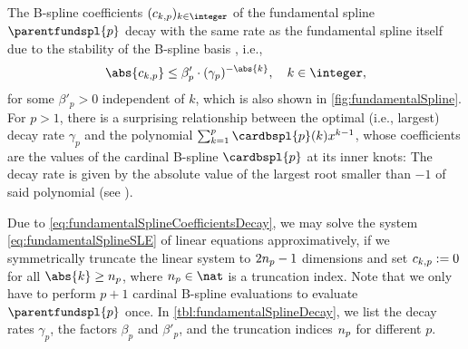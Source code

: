 The B-spline coefficients $(\fundsplcoeff{k}{p})_{k \in \integer}$ of the
fundamental spline $\parentfundspl{p}$ decay with the same rate
as the fundamental spline itself due to the stability of the B-spline basis
\cite{Hoellig13Approximation}, i.e.,
\begin{equation}
  \label{eq:fundamentalSplineCoefficientsDecay}
  \abs{\fundsplcoeff{k}{p}}
  \le \beta'_p \cdot (\gamma_p)^{-\abs{k}},\quad
  k \in \integer,
\end{equation}
for some $\beta'_p > 0$ independent of $k$,
which is also shown in \cref{fig:fundamentalSpline}.
For $p > 1$,
there is a surprising relationship between the optimal (i.e., largest)
decay rate $\gamma_p$ and the polynomial
$\sum_{k=1}^p \cardbspl{p}(k) x^{k-1}$,
whose coefficients are the values of the
cardinal B-spline $\cardbspl{p}$ at its inner knots:
The decay rate is given by the absolute value of the largest root smaller
than $-1$ of said polynomial
(see ).

Due to \eqref{eq:fundamentalSplineCoefficientsDecay},
we may solve the system \eqref{eq:fundamentalSplineSLE}
of linear equations approximatively,
if we symmetrically truncate the linear system to
$2n_{p} - 1$ dimensions
and set $\fundsplcoeff{k}{p} := 0$ for all $\abs{k} \ge \fundsplcutoff{p}$,
where $\fundsplcutoff{p} \in \nat$ is a truncation index.
Note that we only have to perform $p + 1$ cardinal B-spline evaluations
to evaluate $\parentfundspl{p}$ once.
In \cref{tbl:fundamentalSplineDecay}, we list the decay rates $\gamma_p$,
the factors $\beta_p$ and $\beta'_p$, and the truncation indices
$n_{p}$ for different $p$.

